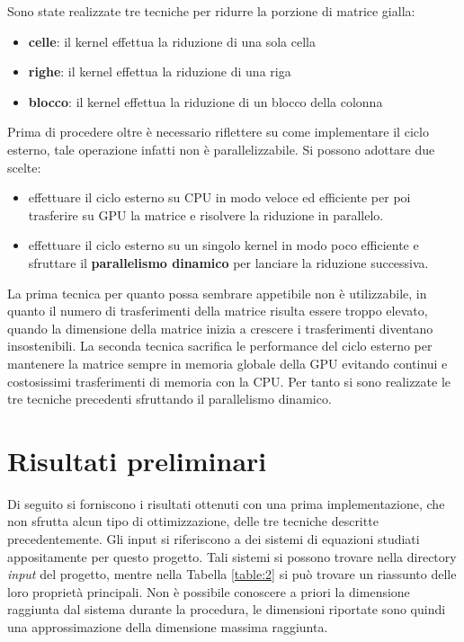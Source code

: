 \documentclass{article}
\begin{document}
Sono state realizzate tre tecniche per ridurre la porzione di matrice gialla:
\begin{itemize}
\item \textbf{celle}: il kernel effettua la riduzione di una sola cella
\item \textbf{righe}: il kernel effettua la riduzione di una riga 
\item \textbf{blocco}: il kernel effettua la riduzione di un blocco della colonna
\end{itemize}

\newpage
Prima di procedere oltre è necessario riflettere su come implementare il ciclo esterno, tale operazione infatti non è parallelizzabile. Si possono adottare due scelte:
\begin{itemize}
\item effettuare il ciclo esterno su CPU in modo veloce ed efficiente per poi trasferire su GPU la matrice e risolvere la riduzione in parallelo.
\item effettuare il ciclo esterno su un singolo kernel in modo poco efficiente e sfruttare il \textbf{parallelismo dinamico} per lanciare la riduzione successiva.
\end{itemize}

La prima tecnica per quanto possa sembrare appetibile non è utilizzabile, in quanto il numero di trasferimenti della matrice risulta essere troppo elevato, quando la dimensione della matrice inizia a crescere i trasferimenti diventano insostenibili. La seconda tecnica sacrifica le performance del ciclo esterno per mantenere la matrice sempre in memoria globale della GPU evitando continui e costosissimi trasferimenti di memoria con la CPU. Per tanto si sono realizzate le tre tecniche precedenti sfruttando il parallelismo dinamico.

\section{Risultati preliminari}
Di seguito si forniscono i risultati ottenuti con una prima implementazione, che non sfrutta alcun tipo di ottimizzazione, delle tre tecniche descritte precedentemente. Gli input si riferiscono a dei sistemi di equazioni studiati appositamente per questo progetto. Tali sistemi si possono trovare nella directory \textit{input} del progetto, mentre nella Tabella \ref{table:2} si può trovare un riassunto delle loro proprietà principali. Non è possibile conoscere a priori la dimensione raggiunta dal sistema durante la procedura, le dimensioni riportate sono quindi una approssimazione della dimensione massima raggiunta. 
\end{document}

